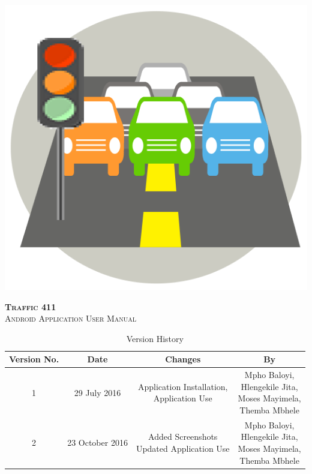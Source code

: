 \documentclass[a4paper,12pt]{article}
\begin{document}
\includegraphics[width=\textwidth]{images/coverPage.png}
\begin{center}
\textsc{\textbf{\LARGE Traffic 411}}\\[1.5cm]
\textsc{\Large Android Application User Manual}\\[0.5cm]
\end{center}

\newpage
\tableofcontents
\newpage

\newpage
\begin{table}[ht]
 \centering
 \caption{Version History}
 \label{tab:table1}
 \begin{tabular}{cccc}
   \toprule
    Version No. & Date & Changes & By\\
    \midrule
    1 & 29 July 2016 & \makecell{Application Installation, \\ Application Use} & \makecell{Mpho Baloyi,\\ Hlengekile Jita,\\ Moses Mayimela,\\ Themba Mbhele} \\
   2 & 23 October 2016 & \makecell{Added Screenshots \\ Updated Application Use} & \makecell{Mpho Baloyi,\\ Hlengekile Jita,\\ Moses Mayimela,\\ Themba Mbhele} \\
    \bottomrule
  \end{tabular}
\end{table}
\newpage
\end{document}
